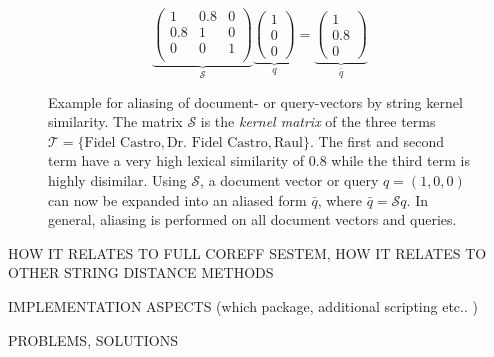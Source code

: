 \begin{figure}[ht]
  \caption{Example for aliasing of document- or query-vectors by string kernel similarity.
The matrix $\mathcal{S}$ is the \textit{kernel matrix} of the three terms $\mathcal{T} = \lbrace
\text{Fidel Castro},\text{Dr. Fidel Castro}, \text{Raul}\rbrace$. The first and second term have a
very high lexical similarity of $0.8$ while the third term is highly disimilar. Using
$\mathcal{S}$, a document vector or query $q=(1,0,0)$ can now be expanded into an aliased form
$\bar q$, where $\bar q = \mathcal{S}q$. In general, aliasing is performed on all document vectors
and queries.}
  \[
     \underbrace{\begin{pmatrix}
      1   & 0.8 & 0\\
      0.8 & 1   & 0\\
      0   & 0   & 1\\
     \end{pmatrix}}_{\mathcal{S}}
     \underbrace{\begin{pmatrix}
     1\\ 0\\0 
     \end{pmatrix}}_{q}
     =
     \underbrace{\begin{pmatrix}
     1\\ 0.8\\0 
     \end{pmatrix}}_{\bar q}
  \]
  \label{eq:example_string_sim}
\end{figure}


HOW IT RELATES TO FULL COREFF SESTEM, HOW IT RELATES TO OTHER STRING DISTANCE METHODS

IMPLEMENTATION ASPECTS (which package, additional scripting etc.. )

PROBLEMS, SOLUTIONS



